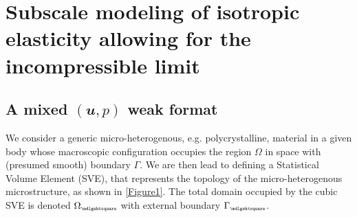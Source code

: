 \documentclass[12pt,a4paper]{article}
\renewcommand{\ta}[1]{\mathbfit{#1}}
\renewcommand{\Box}{\mdlgwhtsquare}
\newcommand{\rve}{
  {\mathchoice
   {\mbox{\scalebox{0.67}{$\Box$}}}
   {\mbox{\scalebox{0.67}{$\Box$}}}
   {\mbox{\scalebox{0.5}{$\Box$}}}
   {\mbox{\scalebox{0.375}{$\Box$}}}
  }
}
\begin{document}
\section{Subscale modeling of isotropic elasticity allowing for the incompressible limit}

\subsection{A mixed $(\ta{u},p)$ weak format}

We consider a generic micro-heterogenous, e.g. polycrystalline, material in a given body whose macroscopic configuration occupies the region $\Omega$ in space with (presumed smooth) boundary $\Gamma$.
We are then lead to defining a Statistical Volume Element (SVE), that represents the topology of the micro-heterogenous microstructure, as shown in \cref{Figure1}.
The total domain occupied by the cubic SVE is denoted $\Omega_\rve$ with external boundary $\Gamma_\rve$.
\end{document}
